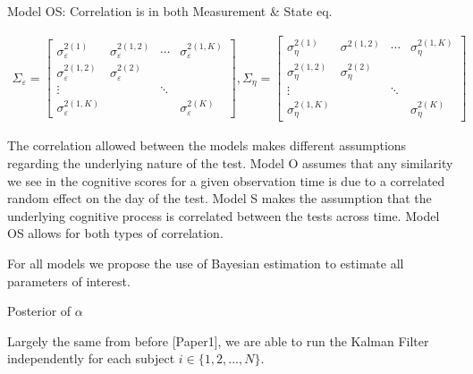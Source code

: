 \documentclass[
]{article}
\begin{document}
Model OS: Correlation is in both Measurement \& State eq.

\begin{equation*}
\begin{aligned}
\Sigma_\varepsilon = 
\begin{bmatrix}
\sigma^{2(1)}_\varepsilon & \sigma^{2(1,2)}_\varepsilon & \cdots & \sigma^{2(1, K)}_\varepsilon\\
\sigma^{2(1,2)}_\varepsilon & \sigma^{2(2)}_\varepsilon\\
\vdots & & \ddots\\
\sigma^{2(1, K)}_\varepsilon & & &\sigma^{2(K)}_\varepsilon
\end{bmatrix},
\Sigma_\eta =
\begin{bmatrix}
\sigma^{2(1)}_\eta & \sigma^{2(1,2)} & \cdots & \sigma^{2(1, K)}_\eta\\
\sigma^{2(1,2)}_\eta & \sigma^{2(2)}_\eta\\
\vdots & & \ddots\\
\sigma^{2(1, K)}_\eta & & &\sigma^{2(K)}_\eta
\end{bmatrix}
\end{aligned}
\end{equation*}

The correlation allowed between the models makes different assumptions regarding the underlying nature of the test. Model O assumes that any similarity we see in the cognitive scores for a given observation time is due to a correlated random effect on the day of the test. Model S makes the assumption that the underlying cognitive process is correlated between the tests across time. Model OS allows for both types of correlation.

For all models we propose the use of Bayesian estimation to estimate all parameters of interest.

Posterior of \(\alpha\)

Largely the same from before {[}Paper1{]}, we are able to run the Kalman Filter independently for each subject \(i \in \{1, 2, ..., N\}\).
\end{document}
